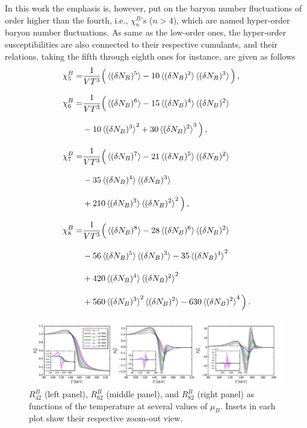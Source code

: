 \documentclass[%
reprint,
superscriptaddress,
showpacs,preprintnumbers,
amsmath,amssymb,
aps,
prd,
]{revtex4-1}
\begin{document}
In this work the emphasis is, however, put on the baryon number fluctuations of order higher than the fourth, i.e., $\chi_n^{B}$'s ($n>4$), which are named hyper-order baryon number fluctuations. As same as the low-order ones, the hyper-order susceptibilities are also connected to their respective cumulants, and their relations, taking the fifth through eighth ones for instance, are given as follows
{\allowdisplaybreaks
%
\begin{align}
\chi^B_5=&\frac{1}{VT^3}\Big(\braket{(\delta N_B)^5}-10\braket{(\delta N_B)^2}\braket{(\delta N_B)^3}\Big)\,,\\[2ex]
\chi^B_6=&\frac{1}{VT^3}\Big(\braket{(\delta N_B)^6}-15\braket{(\delta N_B)^4}\braket{(\delta N_B)^2}\nonumber\\[2ex]
&-10\braket{(\delta N_B)^3}^2+30\braket{(\delta N_B)^2}^3\Big)\,,\\[2ex]
\chi^B_7=&\frac{1}{VT^3}\Big(\braket{(\delta N_B)^7}-21\braket{(\delta N_B)^5}\braket{(\delta N_B)^2}\nonumber\\[2ex]
&-35\braket{(\delta N_B)^4}\braket{(\delta N_B)^3}\nonumber\\[2ex]
&+210\braket{(\delta N_B)^3}\braket{(\delta N_B)^2}^2\Big)\,,\\[2ex]
\chi^B_8=&\frac{1}{VT^3}\Big(\braket{(\delta N_B)^8}-28\braket{(\delta N_B)^6}\braket{(\delta N_B)^2}\nonumber\\[2ex]
&-56\braket{(\delta N_B)^5}\braket{(\delta N_B)^3}-35\braket{(\delta N_B)^4}^2\nonumber\\[2ex]
&+420\braket{(\delta N_B)^4}\braket{(\delta N_B)^2}^2\nonumber\\[2ex]
&+560\braket{(\delta N_B)^3}^2\braket{(\delta N_B)^2}-630\braket{(\delta N_B)^2}^4\Big)\,.
\end{align}
%
}

%
\begin{figure}[t]
\includegraphics[width=1.\textwidth]{R42R62R82-T-muB0to400}
\caption{$R^{B}_{42}$ (left panel), $R^{B}_{62}$ (middle panel), and $R^{B}_{82}$ (right panel) as functions of the temperature at several values of $\mu_B$. Insets in each plot show their respective zoom-out view.}\label{fig:R42R62R82-T-muB0to400}
\end{figure}
%
\end{document}

